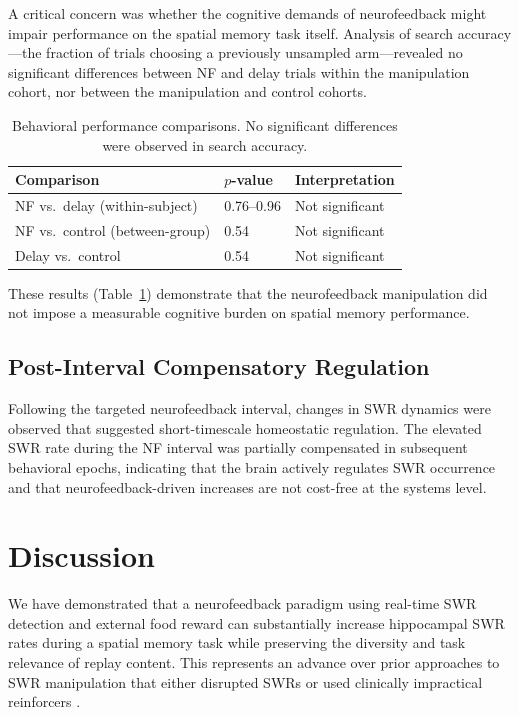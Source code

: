 \documentclass[11pt]{article}
\begin{document}
A critical concern was whether the cognitive demands of neurofeedback might impair performance on the spatial memory task itself. Analysis of search accuracy---the fraction of trials choosing a previously unsampled arm---revealed no significant differences between NF and delay trials within the manipulation cohort, nor between the manipulation and control cohorts.

\begin{table}[ht]
\centering
\caption{Behavioral performance comparisons. No significant differences were observed in search accuracy.}
\label{tab:behavior}
\begin{tabular}{lll}
\toprule
Comparison & $p$-value & Interpretation \\
\midrule
NF vs.\ delay (within-subject) & 0.76--0.96 & Not significant \\
NF vs.\ control (between-group) & 0.54 & Not significant \\
Delay vs.\ control & 0.54 & Not significant \\
\bottomrule
\end{tabular}
\end{table}

These results (Table~\ref{tab:behavior}) demonstrate that the neurofeedback manipulation did not impose a measurable cognitive burden on spatial memory performance.

\subsection{Post-Interval Compensatory Regulation}

Following the targeted neurofeedback interval, changes in SWR dynamics were observed that suggested short-timescale homeostatic regulation. The elevated SWR rate during the NF interval was partially compensated in subsequent behavioral epochs, indicating that the brain actively regulates SWR occurrence and that neurofeedback-driven increases are not cost-free at the systems level.

\section{Discussion}

We have demonstrated that a neurofeedback paradigm using real-time SWR detection and external food reward can substantially increase hippocampal SWR rates during a spatial memory task while preserving the diversity and task relevance of replay content. This represents an advance over prior approaches to SWR manipulation that either disrupted SWRs \citep{girardeau2009,jadhav2012} or used clinically impractical reinforcers \citep{ishikawa2014}.
\end{document}
